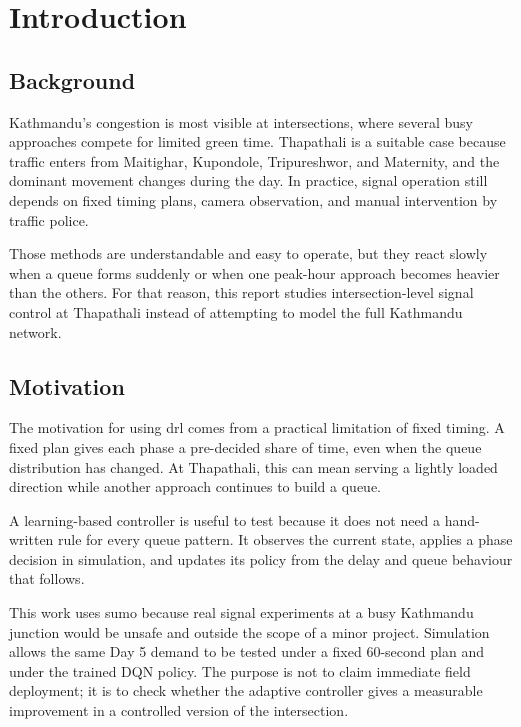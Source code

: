 \chapter{Introduction}
\label{chap:introduction}

\section{Background}
\label{sec:background}

Kathmandu's congestion is most visible at intersections, where several
busy approaches compete for limited green time. Thapathali is a suitable
case because traffic enters from Maitighar, Kupondole, Tripureshwor, and
Maternity, and the dominant movement changes during the day. In practice,
signal operation still depends on fixed timing plans, camera observation,
and manual intervention by traffic police.

Those methods are understandable and easy to operate, but they react
slowly when a queue forms suddenly or when one peak-hour approach becomes
heavier than the others. For that reason, this report studies
intersection-level signal control at Thapathali instead of attempting to
model the full Kathmandu network.

\section{Motivation}
\label{sec:motivation}

The motivation for using \gls{drl} comes from a practical limitation of
fixed timing. A fixed plan gives each phase a pre-decided share of time,
even when the queue distribution has changed. At Thapathali, this can
mean serving a lightly loaded direction while another approach continues
to build a queue.

A learning-based controller is useful to test because it does not need a
hand-written rule for every queue pattern. It observes the current state,
applies a phase decision in simulation, and updates its policy from the
delay and queue behaviour that follows.

This work uses \gls{sumo} because real signal experiments at a busy
Kathmandu junction would be unsafe and outside the scope of a minor
project. Simulation allows the same Day 5 demand to be tested under a
fixed 60-second plan and under the trained DQN policy. The purpose is not
to claim immediate field deployment; it is to check whether the adaptive
controller gives a measurable improvement in a controlled version of the
intersection.

